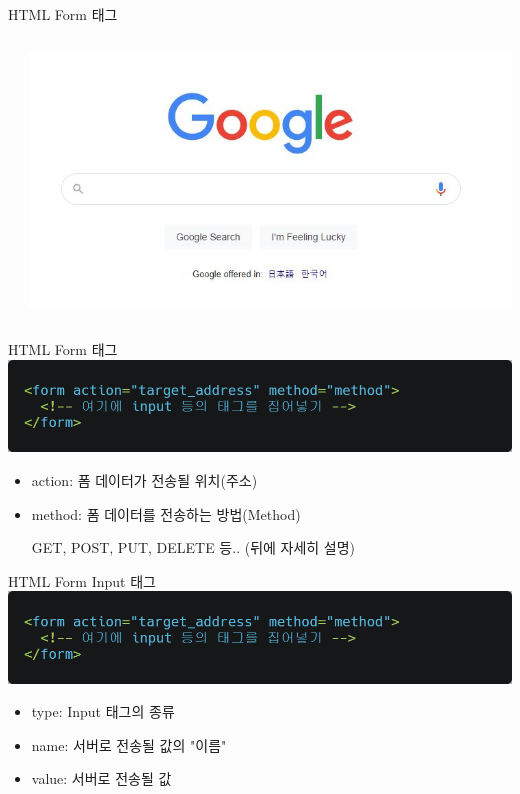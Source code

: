 \documentclass{beamer}
\begin{document}
\begin{frame}{HTML Form 태그}
\begin{columns}
\begin{column}{0.3\textwidth}
            \end{column}
            \begin{column}{0.3\textwidth}
                \includegraphics[width=\linewidth]{Images/google.JPG}
            \end{column}
        \end{columns}
    \end{frame}

    \begin{frame}{HTML Form 태그}
        \includegraphics[width=\linewidth]{Images/form_tag.png}
        \vspace{0.3cm}
        \begin{itemize}
            \item action: 폼 데이터가 전송될 위치(주소)
            \item method: 폼 데이터를 전송하는 방법(Method)
            
            GET, POST, PUT, DELETE 등.. (뒤에 자세히 설명)
        \end{itemize}
    \end{frame}

    \begin{frame}{HTML Form Input 태그}
        \includegraphics[width=\linewidth]{Images/form_tag.png}
        \vspace{0.3cm}
        \begin{itemize}
            \item type: Input 태그의 종류
            \item name: 서버로 전송될 값의 "이름"
            \item value: 서버로 전송될 값
        \end{itemize}
    \end{frame}
\end{document}
